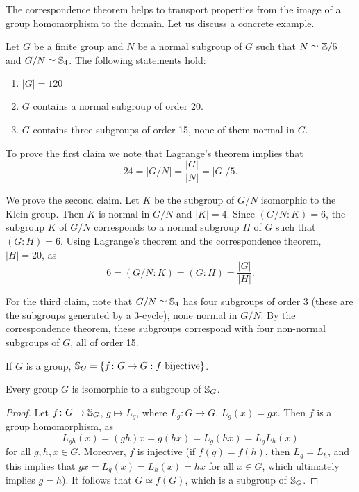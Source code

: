 The correspondence theorem helps to transport  
properties from the image of a group homomorphism 
to the domain. Let us discuss a concrete example. 

\begin{example}
Let $G$ be a finite group and $N$ be a normal subgroup of
$G$ such that $N\simeq\mathbb{Z}/5$ and $G/N\simeq\mathbb{S}_4$. The following statements hold: 
\begin{enumerate}
\item $|G|=120$
\item $G$ contains a normal subgroup of order 20.
\item $G$ contains three subgroups of order 15, none of them normal in $G$.
\end{enumerate}

To prove the first claim we note that 
Lagrange's theorem implies that 
\[
24=|G/N|=\frac{|G|}{|N|}=|G|/5.
\]

We prove the second claim. Let $K$ be the subgroup of $G/N$ isomorphic
to the Klein group. 
Then 
$K$ is normal in $G/N$ and $|K|=4$. Since 
$(G/N:K)=6$,
the subgroup $K$ of $G/N$ corresponds to a normal subgroup $H$ of $G$ such that $(G:H)=6$. Using Lagrange's theorem
and the correspondence theorem, 
$|H|=20$, as 
\[
6=(G/N:K)=(G:H)=\frac{|G|}{|H|}.
\]

For the third claim, note that
$G/N\simeq\mathbb{S}_4$ has four subgroups of order 
 3 (these are the subgroups generated by a 3-cycle),
none normal in $G/N$. By the correspondence theorem, these
subgroups correspond with four non-normal subgroups of $G$, all of order 15. 
\end{example}

If $G$ is a group, $\mathbb{S}_G=\{f\colon G\to G:f\text{ bijective}\}$.

\begin{theorem}[Cayley]
Every group $G$ is isomorphic to a subgroup of $\mathbb{S}_G$.
\end{theorem}

\begin{proof}
Let $f\colon G\to\mathbb{S}_G$, $g\mapsto L_g$, where $L_g\colon G\to G$, $L_g(x)=gx$. Then $f$ is a group homomorphism, as 
\[
L_{gh}(x)=(gh)x=g(hx)=L_g(hx)=L_gL_h(x)
\]
for all $g,h,x\in G$. Moreover, $f$ is injective (if $f(g)=f(h)$, then $L_g=L_h$, and this implies that 
$gx=L_g(x)=L_h(x)=hx$ for all $x\in G$, which ultimately implies $g=h$).
It follows that $G\simeq f(G)$, which is a subgroup of $\mathbb{S}_G$. 
\end{proof}

